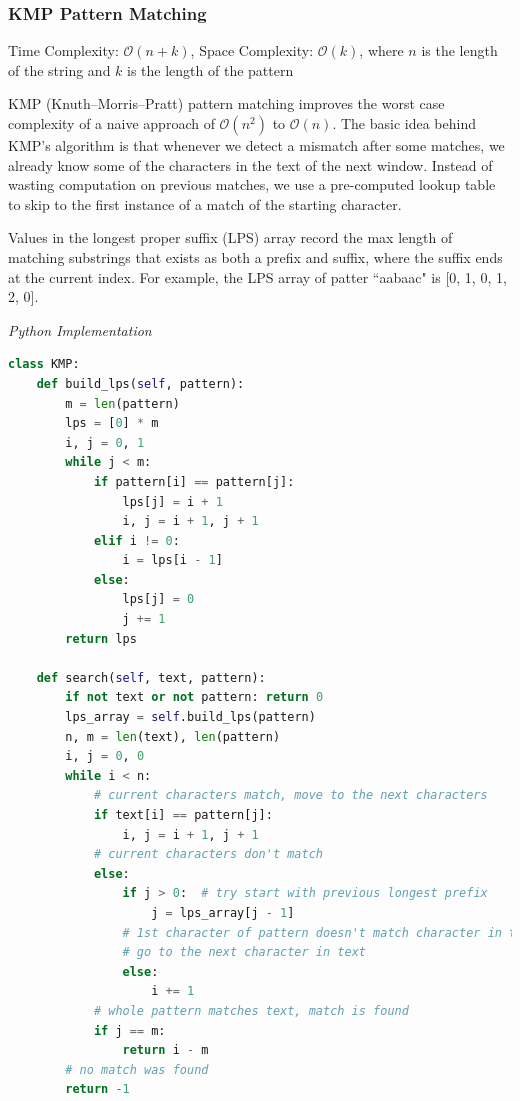 \documentclass{article}
\newcommand{\bigO}{\mathcal{O}}
\begin{document}
    \subsubsection{KMP Pattern Matching}
    Time Complexity: $\bigO(n + k)$, Space Complexity: $\bigO(k)$, where $n$ is the length of the string and $k$ is the length of the pattern
    
    KMP (Knuth--Morris--Pratt) pattern matching improves the worst case complexity of a naive approach of $\bigO(n^2)$ to $\bigO(n)$. The basic idea behind KMP’s algorithm is that whenever we detect a mismatch after some matches, we already know some of the characters in the text of the next window. Instead of wasting computation on previous matches, we use a pre-computed lookup table to skip to the first instance of a match of the starting character.
    
    Values in the longest proper suffix (LPS) array record the max length of matching substrings that exists as both a prefix and suffix, where the suffix ends at the current index. For example, the LPS array of patter ``aabaac" is [0, 1, 0, 1, 2, 0].
    
\vspace{8pt} \emph{Python Implementation}
\begin{lstlisting}[language=Python]    
class KMP:
    def build_lps(self, pattern):
        m = len(pattern)
        lps = [0] * m
        i, j = 0, 1
        while j < m: 
            if pattern[i] == pattern[j]: 
                lps[j] = i + 1
                i, j = i + 1, j + 1
            elif i != 0:
                i = lps[i - 1]
            else:
                lps[j] = 0
                j += 1
        return lps
        
    def search(self, text, pattern):
        if not text or not pattern: return 0
        lps_array = self.build_lps(pattern)
        n, m = len(text), len(pattern)
        i, j = 0, 0
        while i < n:
            # current characters match, move to the next characters
            if text[i] == pattern[j]:
                i, j = i + 1, j + 1
            # current characters don't match
            else:
                if j > 0:  # try start with previous longest prefix
                    j = lps_array[j - 1]
                # 1st character of pattern doesn't match character in text
                # go to the next character in text
                else:
                    i += 1
            # whole pattern matches text, match is found
            if j == m:
                return i - m
        # no match was found
        return -1
\end{lstlisting}
    
\end{document}
